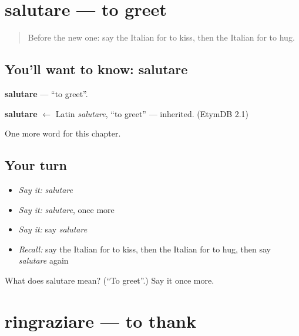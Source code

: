 \section[salutare]{salutare — to greet}

\label{lesson:IT-C174-salutare}



\begin{quote}
Before the new one: say the Italian for to kiss, then the Italian for to hug.
\end{quote}

\subsection*{You'll want to know: salutare}
\textbf{salutare} — \textquotedblleft{}to greet\textquotedblright{}.

\begin{cousinweb}
\textbf{salutare} $\leftarrow$ Latin \emph{salutare}, \textquotedblleft{}to greet\textquotedblright{} — inherited. (EtymDB 2.1)
\end{cousinweb}

\begin{grammarlens}[title={What you've built}]
One more word for this chapter.
\end{grammarlens}

\subsection*{Your turn}
\begin{itemize}
\raggedright
  \item \emph{Say it:} \emph{salutare}
  \item \emph{Say it:} \emph{salutare}, once more
  \item \emph{Say it:} say \emph{salutare}
  \item \emph{Recall:} say the Italian for to kiss, then the Italian for to hug, then say \emph{salutare} again
\end{itemize}

\begin{tcolorbox}[breakable,colback=teal!4,colframe=teal!35!black,title={Before you move on}]
What does salutare mean? (\textquotedblleft{}To greet\textquotedblright{}.) Say it once more.
\end{tcolorbox}
\section[ringraziare]{ringraziare — to thank}

